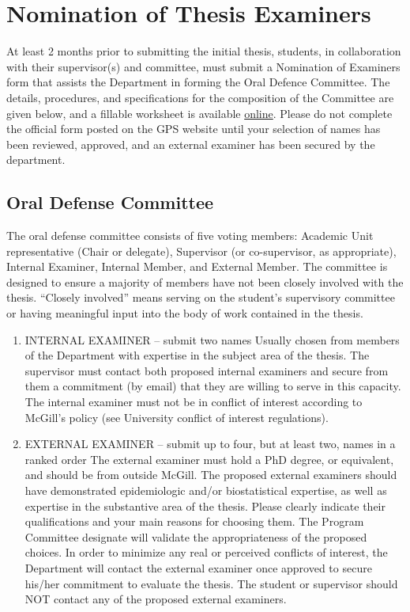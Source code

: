 \documentclass[
  openany]{book}
\begin{document}
\hypertarget{nomination-of-thesis-examiners}{%
\section{Nomination of Thesis Examiners}\label{nomination-of-thesis-examiners}}

At least 2 months prior to submitting the initial thesis, students, in collaboration with their supervisor(s) and committee, must submit a Nomination of Examiners form that assists the Department in forming the Oral Defence Committee. The details, procedures, and specifications for the composition of the Committee are given below, and a fillable worksheet is available \href{https://www.mcgill.ca/epi-biostat-occh/files/epi-biostat-occh/eboh_phd_nom_exam_worksheet_201911.docx}{online}. Please do not complete the official form posted on the GPS website until your selection of names has been reviewed, approved, and an external examiner has been secured by the department.

\hypertarget{oral-defense-committee}{%
\subsection{Oral Defense Committee}\label{oral-defense-committee}}

The oral defense committee consists of five voting members: Academic Unit representative (Chair or delegate), Supervisor (or co-supervisor, as appropriate), Internal Examiner, Internal Member, and External Member. The committee is designed to ensure a majority of members have not been closely involved with the thesis. ``Closely involved'' means serving on the student's supervisory committee or having meaningful input into the body of work contained in the thesis.

\begin{enumerate}
\def\labelenumi{\arabic{enumi}.}
\item
  INTERNAL EXAMINER -- submit two names
  Usually chosen from members of the Department with expertise in the subject area of the thesis. The supervisor must contact both proposed internal examiners and secure from them a commitment (by email) that they are willing to serve in this capacity. The internal examiner must not be in conflict of interest according to McGill's policy (see University conflict of interest regulations).
\item
  EXTERNAL EXAMINER -- submit up to four, but at least two, names in a ranked order
  The external examiner must hold a PhD degree, or equivalent, and should be from outside McGill. The proposed external examiners should have demonstrated epidemiologic and/or biostatistical expertise, as well as expertise in the substantive area of the thesis. Please clearly indicate their qualifications and your main reasons for choosing them. The Program Committee designate will validate the appropriateness of the proposed choices. In order to minimize any real or perceived conflicts of interest, the Department will contact the external examiner once approved to secure his/her commitment to evaluate the thesis. The student or supervisor should NOT contact any of the proposed external examiners.
\end{enumerate}
\end{document}
